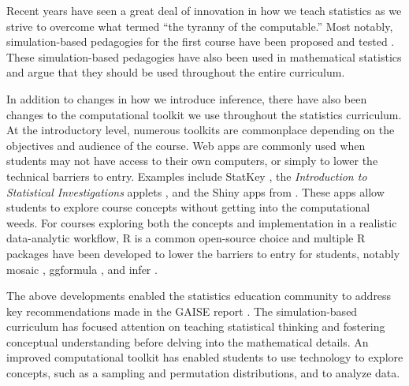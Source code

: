 \documentclass[12pt]{article}
\begin{document}
Recent years have seen a great deal of innovation in how we teach
statistics as we strive to overcome what \citet{Cobb-2007uo} termed
``the tyranny of the computable.'' Most notably, simulation-based
pedagogies for the first course have been proposed and tested
\citep{Cobb-2007uo, Tintle-2011vo, Tintle-2012td, Maurer-2014te, Tintle2014-vt, Hildreth2018}.
These simulation-based pedagogies have also been used in mathematical
statistics \citep{chihara2011, Cobb2011-vz} and \citet{Tintle2015-yv}
argue that they should be used throughout the entire curriculum.

In addition to changes in how we introduce inference, there have also
been changes to the computational toolkit we use throughout the
statistics curriculum. At the introductory level, numerous toolkits are
commonplace depending on the objectives and audience of the course. Web
apps are commonly used when students may not have access to their own
computers, or simply to lower the technical barriers to entry. Examples
include StatKey \citep{Lock2017}, the \emph{Introduction to Statistical
Investigations} applets \citep{tintle2015}, and the Shiny apps from
\citet{agresti2017}. These apps allow students to explore course
concepts without getting into the computational weeds. For courses
exploring both the concepts and implementation in a realistic
data-analytic workflow, R \citep{r} is a common open-source choice and
multiple R packages have been developed to lower the barriers to entry
for students, notably mosaic \citep{Pruim2017-uc}, ggformula
\citep{ggformula}, and infer \citep{infer}.

The above developments enabled the statistics education community to
address key recommendations made in the GAISE report \citep{gaise2016}.
The simulation-based curriculum has focused attention on teaching
statistical thinking and fostering conceptual understanding before
delving into the mathematical details. An improved computational toolkit
has enabled students to use technology to explore concepts, such as a
sampling and permutation distributions, and to analyze data.
\end{document}
